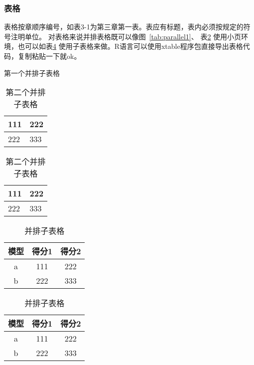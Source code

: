 \documentclass{SUFEThesis}
\begin{document}
\subsubsection{表格}
表格按章顺序编号，如表3-1为第三章第一表。表应有标题，表内必须按规定的符号注明单位。
对表格来说并排表格既可以像图~\ref{tab:parallel1}、
表\ref{tab:parallel2} 使用小页环境，也可以如表\ref{tab:subtable} 使用子表格来做。R语言可以使用xtable程序包直接导出表格代码，复制粘贴一下就ok。

\begin{table}[htbp]
    \noindent\begin{minipage}{0.5\textwidth}
        \centering
        \caption{第一个并排子表格}
        \label{tab:parallel1}
        \begin{tabular}{p{2cm}p{2cm}}
            \toprule
            111 & 222 \\\midrule
            222 & 333 \\\bottomrule
        \end{tabular}
    \end{minipage}%
    \begin{minipage}{0.5\textwidth}
        \centering
        \caption{第二个并排子表格}
        \label{tab:parallel2}
        \begin{tabular}{p{2cm}p{2cm}}
            \toprule
            111 & 222 \\\midrule
            222 & 333 \\\bottomrule
        \end{tabular}
    \end{minipage}
\end{table}


\begin{table}[htbp]
    \centering
    \caption{并排子表格}
    \label{tab:subtable}
    {
        \begin{tabular}{c|c|c}
            \hline
            模型 & 得分1 & 得分2 \\
            \hline
            a  & 111 & 222 \\
            b  & 222 & 333 \\
            \hline
        \end{tabular}
    }
    \hskip2cm
    {
        \begin{tabular}{c|c|c}
            \hline
            模型 & 得分1 & 得分2 \\
            \hline
            a  & 111 & 222 \\
            b  & 222 & 333 \\
            \hline
        \end{tabular}
    }
\end{table}
\end{document}

